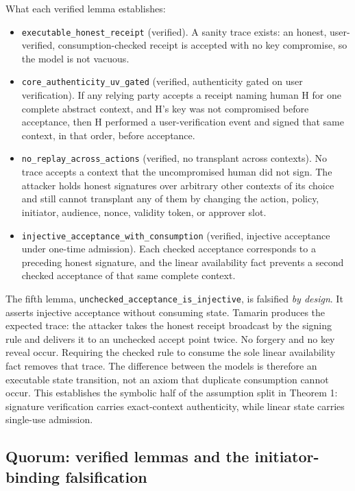 \documentclass[11pt]{article}
\newcommand{\code}[1]{\texttt{#1}}
\begin{document}
What each verified lemma establishes:

\begin{itemize}[leftmargin=*]
\item \code{executable\_honest\_receipt} (verified). A sanity trace exists: an
honest, user-verified, consumption-checked receipt is accepted with no key
compromise, so the model is not vacuous.
\item \code{core\_authenticity\_uv\_gated} (verified, authenticity gated on user
verification). If any relying party accepts a receipt naming human H for one
complete abstract context, and H's key was not compromised before acceptance,
then H performed a user-verification event and signed that same context, in that
order, before acceptance.
\item \code{no\_replay\_across\_actions} (verified, no transplant across
contexts). No trace accepts a context that the uncompromised human did not sign.
The attacker holds honest signatures over arbitrary other contexts of its choice
and still cannot transplant any of them by changing the action, policy,
initiator, audience, nonce, validity token, or approver slot.
\item \code{injective\_acceptance\_with\_consumption} (verified, injective
acceptance under one-time admission). Each checked acceptance corresponds to a
preceding honest signature, and the linear availability fact prevents a second
checked acceptance of that same complete context.
\end{itemize}

The fifth lemma, \code{unchecked\_acceptance\_is\_injective}, is falsified
\emph{by design}. It asserts injective acceptance without consuming state.
Tamarin produces the expected trace: the attacker takes the honest receipt
broadcast by the signing rule and delivers it to an unchecked accept point
twice. No forgery and no key reveal occur. Requiring the checked rule to consume
the sole linear availability fact removes that trace. The difference between
the models is therefore an executable state transition, not an axiom that
duplicate consumption cannot occur. This establishes the symbolic half of the
assumption split in Theorem 1: signature verification carries exact-context
authenticity, while linear state carries single-use admission.

\subsection{Quorum: verified lemmas and the initiator-binding falsification}
\end{document}
